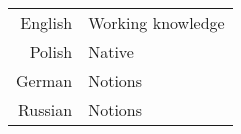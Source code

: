 \documentclass[theme]{cv_einstein}
\begin{document}
\begin{paracol}{2}
\begin{leftcolumn*}
{{\begin{minipage}[l]{0.9\leftcolwidth}
                    \vspace{\itemspace}\\
                    \vspace{\itemspace}\\
                    \vspace{\itemspace}\\
                \end{minipage}
            }%
        } %
        {\color{white} 
            \phantom{} \\ %
            \begin{minipage}[r]{\leftcolwidth}
                \begin{tabular}{r|l}
                    English & Working knowledge\\[0.3em]
                    Polish & Native\\[0.3em]
                    German & Notions\\[0.3em]
                    Russian & Notions
                \end{tabular}
            \end{minipage}
            \vspace{\sectionspace}
        } %
        \end{leftcolumn*}
        \begin{rightcolumn}\noindent \small
            \hspace{-2.4pt}     

\end{rightcolumn}
\end{paracol}
\end{document}
